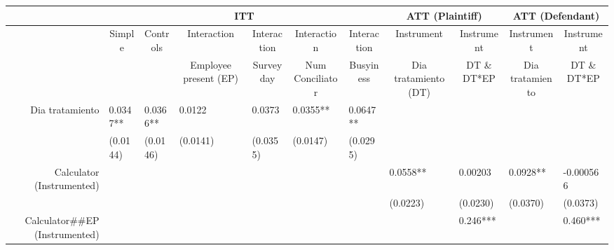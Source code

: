 \begin{tabular}{rrrrrrrrrrr}
\toprule
      & \multicolumn{6}{c}{ITT}                       & \multicolumn{2}{c}{ATT (Plaintiff)} & \multicolumn{2}{c}{ATT (Defendant)} \\
\midrule
      & \multicolumn{1}{c}{Simple} & \multicolumn{1}{c}{Controls} & \multicolumn{1}{c}{Interaction} & \multicolumn{1}{c}{Interaction} & \multicolumn{1}{c}{Interaction} & \multicolumn{1}{c}{Interaction} & \multicolumn{1}{c}{Instrument} & \multicolumn{1}{c}{Instrument} & \multicolumn{1}{c}{Instrument} & \multicolumn{1}{c}{Instrument} \\
      & \multicolumn{1}{c}{} & \multicolumn{1}{c}{} & \multicolumn{1}{c}{Employee present (EP)} & \multicolumn{1}{c}{Survey day} & \multicolumn{1}{c}{Num Conciliator} & \multicolumn{1}{c}{Busyiness} & \multicolumn{1}{c}{Dia tratamiento (DT)} & \multicolumn{1}{c}{DT \& DT*EP} & \multicolumn{1}{c}{Dia tratamiento} & \multicolumn{1}{c}{DT \& DT*EP} \\
Dia tratamiento & \multicolumn{1}{l}{0.0347**} & \multicolumn{1}{l}{0.0366**} & \multicolumn{1}{l}{0.0122} & \multicolumn{1}{l}{0.0373} & \multicolumn{1}{l}{0.0355**} & \multicolumn{1}{l}{0.0647**} & \multicolumn{1}{l}{} & \multicolumn{1}{l}{} & \multicolumn{1}{l}{} & \multicolumn{1}{l}{} \\
      & \multicolumn{1}{l}{(0.0144)} & \multicolumn{1}{l}{(0.0146)} & \multicolumn{1}{l}{(0.0141)} & \multicolumn{1}{l}{(0.0355)} & \multicolumn{1}{l}{(0.0147)} & \multicolumn{1}{l}{(0.0295)} & \multicolumn{1}{l}{} & \multicolumn{1}{l}{} & \multicolumn{1}{l}{} & \multicolumn{1}{l}{} \\
Calculator (Instrumented) & \multicolumn{1}{l}{} & \multicolumn{1}{l}{} & \multicolumn{1}{l}{} & \multicolumn{1}{l}{} & \multicolumn{1}{l}{} & \multicolumn{1}{l}{} & \multicolumn{1}{l}{0.0558**} & \multicolumn{1}{l}{0.00203} & \multicolumn{1}{l}{0.0928**} & \multicolumn{1}{l}{-0.000566} \\
      & \multicolumn{1}{l}{} & \multicolumn{1}{l}{} & \multicolumn{1}{l}{} & \multicolumn{1}{l}{} & \multicolumn{1}{l}{} & \multicolumn{1}{l}{} & \multicolumn{1}{l}{(0.0223)} & \multicolumn{1}{l}{(0.0230)} & \multicolumn{1}{l}{(0.0370)} & \multicolumn{1}{l}{(0.0373)} \\
Calculator\#\#EP (Instrumented) & \multicolumn{1}{l}{} & \multicolumn{1}{l}{} & \multicolumn{1}{l}{} & \multicolumn{1}{l}{} & \multicolumn{1}{l}{} & \multicolumn{1}{l}{} & \multicolumn{1}{l}{} & \multicolumn{1}{l}{0.246***} & \multicolumn{1}{l}{} & \multicolumn{1}{l}{0.460***} \\

\end{tabular}
